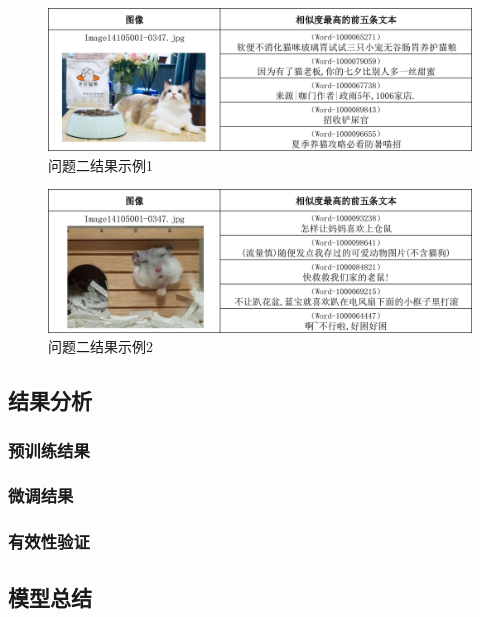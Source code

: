 \documentclass[a4paper]{zreport}
\begin{document}
\begin{figure}[h]
\centering
\includegraphics[width=1.\linewidth]{figures/example21}
\caption{问题二结果示例1}
\label{fig:example21}
\end{figure}

\begin{figure}[h]
\centering
\includegraphics[width=1.\linewidth]{figures/example22}
\caption{问题二结果示例2}
\label{fig:example22}
\end{figure}


\subsection{结果分析}

\subsubsection{预训练结果}

\subsubsection{微调结果}

\subsubsection{有效性验证}

\subsection{模型总结}


\cite{*}

\newpage




\end{document}
